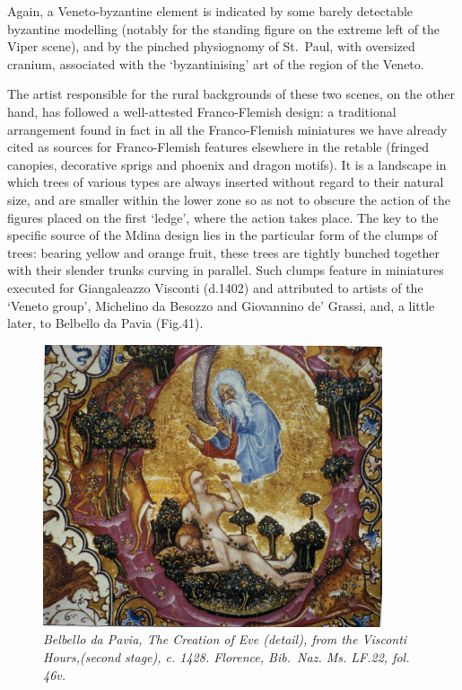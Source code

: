 \documentclass[a4paper,12pt]{article}
\begin{document}
Again, a Veneto-byzantine element is indicated by
some barely detectable byzantine modelling (notably for the standing
figure on the extreme left of the Viper scene), and by the pinched
physiognomy of St.~Paul, with oversized cranium, associated with the
`byzantinising' art of the region of the Veneto.

The artist responsible for the rural backgrounds of these two scenes,
on the other hand, has followed a well-attested Franco-Flemish design:
a traditional arrangement found in fact in all the Franco-Flemish
miniatures we have already cited as sources for Franco-Flemish
features elsewhere in the retable (fringed canopies, decorative sprigs
and phoenix and dragon motifs). It is a landscape in which trees of
various types are always inserted without regard to their natural
size, and are smaller within the lower zone so as not to obscure the
action of the figures placed on the first `ledge', where the action
takes place. The key to the specific source of the Mdina design lies
in the particular form of the clumps of trees: bearing yellow and
orange fruit, these trees are tightly bunched together with their
slender trunks curving in parallel. Such clumps feature in miniatures
executed for Giangaleazzo Visconti (d.1402) and attributed to artists
of the `Veneto group', Michelino da Besozzo and Giovannino de' Grassi,
and, a little later, to Belbello da Pavia (Fig.41). 
\begin{figure}[htbp]
\centering
\includegraphics[width=10cm]{pics/fig41.png}
\caption[Belbello da Pavia, The Creation of Eve (detail), from the Visconti
Hours,(second stage), c. 1428] 
{\it Belbello da Pavia, The Creation of Eve (detail), from the Visconti
Hours,(second stage), c. 1428.  Florence, Bib.~Naz. Ms. LF.22,
fol. 46v.}
\end{figure}
\end{document}
